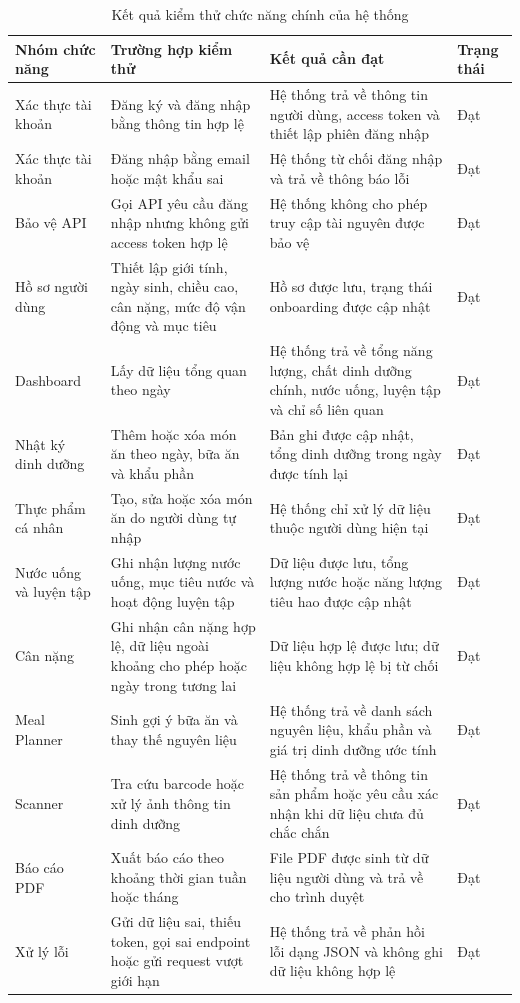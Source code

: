 \begin{table}[H]
\centering
\caption{Kết quả kiểm thử chức năng chính của hệ thống}
\begin{tabular}{|p{3cm}|p{4cm}|p{4cm}|p{4cm}|}
\hline
\textbf{Nhóm chức năng} & \textbf{Trường hợp kiểm thử} & \textbf{Kết quả cần đạt} & \textbf{Trạng thái} \\ \hline
Xác thực tài khoản & Đăng ký và đăng nhập bằng thông tin hợp lệ & Hệ thống trả về thông tin người dùng, access token và thiết lập phiên đăng nhập & Đạt \\ \hline
Xác thực tài khoản & Đăng nhập bằng email hoặc mật khẩu sai & Hệ thống từ chối đăng nhập và trả về thông báo lỗi & Đạt \\ \hline
Bảo vệ API & Gọi API yêu cầu đăng nhập nhưng không gửi access token hợp lệ & Hệ thống không cho phép truy cập tài nguyên được bảo vệ & Đạt \\ \hline
Hồ sơ người dùng & Thiết lập giới tính, ngày sinh, chiều cao, cân nặng, mức độ vận động và mục tiêu & Hồ sơ được lưu, trạng thái onboarding được cập nhật & Đạt \\ \hline
Dashboard & Lấy dữ liệu tổng quan theo ngày & Hệ thống trả về tổng năng lượng, chất dinh dưỡng chính, nước uống, luyện tập và chỉ số liên quan & Đạt \\ \hline
Nhật ký dinh dưỡng & Thêm hoặc xóa món ăn theo ngày, bữa ăn và khẩu phần & Bản ghi được cập nhật, tổng dinh dưỡng trong ngày được tính lại & Đạt \\ \hline
Thực phẩm cá nhân & Tạo, sửa hoặc xóa món ăn do người dùng tự nhập & Hệ thống chỉ xử lý dữ liệu thuộc người dùng hiện tại & Đạt \\ \hline
Nước uống và luyện tập & Ghi nhận lượng nước uống, mục tiêu nước và hoạt động luyện tập & Dữ liệu được lưu, tổng lượng nước hoặc năng lượng tiêu hao được cập nhật & Đạt \\ \hline
Cân nặng & Ghi nhận cân nặng hợp lệ, dữ liệu ngoài khoảng cho phép hoặc ngày trong tương lai & Dữ liệu hợp lệ được lưu; dữ liệu không hợp lệ bị từ chối & Đạt \\ \hline
Meal Planner & Sinh gợi ý bữa ăn và thay thế nguyên liệu & Hệ thống trả về danh sách nguyên liệu, khẩu phần và giá trị dinh dưỡng ước tính & Đạt \\ \hline
Scanner & Tra cứu barcode hoặc xử lý ảnh thông tin dinh dưỡng & Hệ thống trả về thông tin sản phẩm hoặc yêu cầu xác nhận khi dữ liệu chưa đủ chắc chắn & Đạt \\ \hline
Báo cáo PDF & Xuất báo cáo theo khoảng thời gian tuần hoặc tháng & File PDF được sinh từ dữ liệu người dùng và trả về cho trình duyệt & Đạt \\ \hline
Xử lý lỗi & Gửi dữ liệu sai, thiếu token, gọi sai endpoint hoặc gửi request vượt giới hạn & Hệ thống trả về phản hồi lỗi dạng JSON và không ghi dữ liệu không hợp lệ & Đạt \\ \hline
\end{tabular}
\end{table}

